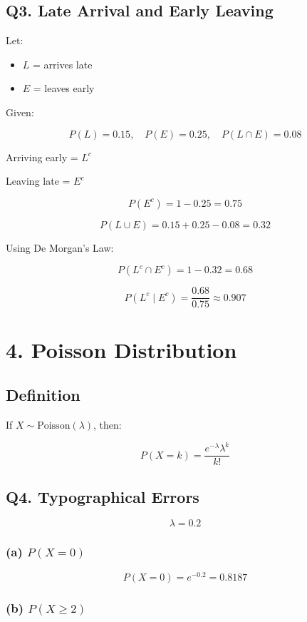 \documentclass[12pt]{article}
\begin{document}
\subsection*{Q3. Late Arrival and Early Leaving}

Let:
\begin{itemize}
    \item $L$ = arrives late
    \item $E$ = leaves early
\end{itemize}

Given:

\[
P(L) = 0.15,\quad P(E) = 0.25,\quad P(L \cap E) = 0.08
\]

Arriving early = $L^c$

Leaving late = $E^c$

\[
P(E^c) = 1 - 0.25 = 0.75
\]

\[
P(L \cup E) = 0.15 + 0.25 - 0.08 = 0.32
\]

Using De Morgan’s Law:

\[
P(L^c \cap E^c) = 1 - 0.32 = 0.68
\]

\[
P(L^c \mid E^c) =
\frac{0.68}{0.75}
\approx 0.907
\]

\section*{4. Poisson Distribution}

\subsection*{Definition}

If $X \sim \text{Poisson}(\lambda)$, then:

\[
P(X = k) =
\frac{e^{-\lambda} \lambda^k}{k!}
\]

\subsection*{Q4. Typographical Errors}

\[
\lambda = 0.2
\]

\subsubsection*{(a) $P(X=0)$}

\[
P(X=0) = e^{-0.2} = 0.8187
\]

\subsubsection*{(b) $P(X \ge 2)$}
\end{document}
